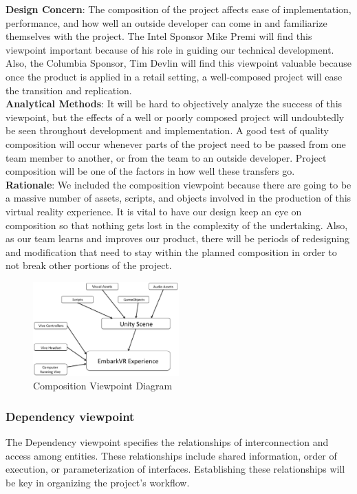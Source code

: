 \documentclass[10pt,journal,compsoc,onecolumn, draftclsnofoot]{IEEEtran}
\begin{document}
\hangindent=0.5cm \textbf{Design Concern}: The composition of the project affects ease of implementation, performance, and how well an outside developer can come in
and familiarize themselves with the project. The Intel Sponsor Mike Premi will
find this viewpoint important because of his role in guiding our technical
development. Also, the Columbia Sponsor, Tim Devlin will find this viewpoint
valuable because once the product is applied in a retail setting, a well-composed project
will ease the transition and replication.\\

\hangindent=0.5cm \textbf{Analytical Methods}: It will be hard to objectively analyze the success of this viewpoint, but the effects of a well or poorly composed project will
undoubtedly be seen throughout development and implementation. A good test of
quality composition will occur whenever parts of the project need to be
passed from one team member to another, or from the team to an outside
developer. Project composition will be one of the factors in how well these
transfers go.\\

\hangindent=0.5cm \textbf{Rationale}: We included the composition viewpoint because there are going to be a massive number of assets, scripts, and objects involved in the
production of this virtual reality experience. It is vital to have our design
keep an eye on composition so that nothing gets lost in the complexity of the
undertaking. Also, as our team learns and improves our product, there will be
periods of redesigning and modification that need to stay within the planned
composition in order to not break other portions of the project.

\begin{figure}[h]
\centering
\caption{Composition Viewpoint Diagram}
\includegraphics[width=0.5\textwidth]{projectComposition.eps}
\end{figure}

\subsubsection{Dependency viewpoint}
The Dependency viewpoint specifies the relationships of interconnection and access among entities. These relationships include shared information, order of execution, or parameterization of interfaces. Establishing these relationships will be key in organizing the project's workflow.\\
\end{document}
